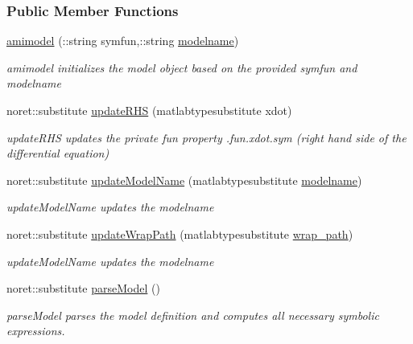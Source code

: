 \subsubsection*{Public Member Functions}
\begin{DoxyCompactItemize}
\item 
\mbox{\hyperlink{classamimodel_a05d52506788717b3d482845748446a60}{amimodel}} (\+::string symfun,\+::string \mbox{\hyperlink{classamimodel_a71bca9c21a6de42d8079ade31cb61044}{modelname}})
\begin{DoxyCompactList}\small\item\em amimodel initializes the model object based on the provided symfun and modelname \end{DoxyCompactList}\item 
noret\+::substitute \mbox{\hyperlink{classamimodel_aa508c0cd4ac026e464f85cec25678850}{update\+R\+HS}} (matlabtypesubstitute xdot)
\begin{DoxyCompactList}\small\item\em update\+R\+HS updates the private fun property .fun.\+xdot.\+sym (right hand side of the differential equation) \end{DoxyCompactList}\item 
noret\+::substitute \mbox{\hyperlink{classamimodel_a5692662c7851369abd5ca0e51295f33a}{update\+Model\+Name}} (matlabtypesubstitute \mbox{\hyperlink{classamimodel_a71bca9c21a6de42d8079ade31cb61044}{modelname}})
\begin{DoxyCompactList}\small\item\em update\+Model\+Name updates the modelname \end{DoxyCompactList}\item 
noret\+::substitute \mbox{\hyperlink{classamimodel_a802e66e0a311bd894de30058b7bf028a}{update\+Wrap\+Path}} (matlabtypesubstitute \mbox{\hyperlink{classamimodel_a0b316a20054ba282555674d939a82406}{wrap\+\_\+path}})
\begin{DoxyCompactList}\small\item\em update\+Model\+Name updates the modelname \end{DoxyCompactList}\item 
noret\+::substitute \mbox{\hyperlink{classamimodel_ae4172c2a8fac8b7c434f03274fcac6ac}{parse\+Model}} ()
\begin{DoxyCompactList}\small\item\em parse\+Model parses the model definition and computes all necessary symbolic expressions. \end{DoxyCompactList}\item 

\end{DoxyCompactItemize}
